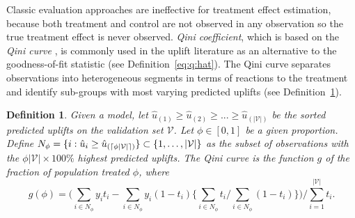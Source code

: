 \documentclass{article}
\def\x{\mathbf x}
\def \real{\rm I\!R}
\def \vahid {\color{magenta}}
\DeclarePairedDelimiter{\ceil}{\lceil}{\rceil}
\newtheorem{definition}{Definition}
\begin{document}
Classic evaluation approaches are ineffective  for treatment effect estimation, because both treatment and control are not observed in any observation so the true treatment effect is never observed.
{\it Qini coefficient}, which is based on the {\it Qini curve} \citep{radcliffe2007using}, is commonly used in the uplift literature as an alternative to the goodness-of-fit statistic (see Definition~\ref{eq:q:hat}). The Qini curve separates  observations into heterogeneous segments in terms of  reactions to the treatment and identify sub-groups with most varying predicted uplifts (see Definition~\ref{def:qini_curve}).\\

\begin{definition}
    Given a model, let $\hat{u}_{(1)} \geq \hat{u}_{(2)} \geq ... \geq \hat{u}_{(|\mathcal{V}|)}$ be the sorted predicted uplifts on the validation set $\mathcal{V}$. Let $\phi \in [0,1]$ be a given proportion. Define $ N_{\phi} = \{i: \hat{u}_{i} \geq \hat{u}_{(\ceil{\phi |\mathcal{V}|})} \} \subset \lbrace 1, \ldots, |\mathcal{V}| \rbrace$ as the subset of observations with the $\phi |\mathcal{V}| \times 100 \%$ highest predicted uplifts. %
    The \textit{Qini curve} is the function $g$ of the fraction of population treated $\phi$, where 
\begin{equation}
    g(\phi) = \biggl(\sum\limits_{i \in  N_{\phi}} y_i t_i - \sum\limits_{i \in  N_{\phi}} y_i (1-t_i) \biggl\{ \sum\limits_{i \in  N_{\phi}} t_i / \sum\limits_{i \in  N_{\phi}} (1-t_i) \biggr\} \biggr) / \sum_{i=1}^{|\mathcal{V}|} t_i.
\end{equation}
    \label{def:qini_curve}
\end{definition}
\end{document}
